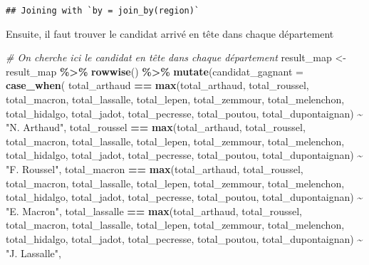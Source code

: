 \documentclass[
]{article}
\newenvironment{Shaded}{\begin{snugshade}}{\end{snugshade}}
\newcommand{\AttributeTok}[1]{\textcolor[rgb]{0.13,0.29,0.53}{#1}}
\newcommand{\CommentTok}[1]{\textcolor[rgb]{0.56,0.35,0.01}{\textit{#1}}}
\newcommand{\FunctionTok}[1]{\textcolor[rgb]{0.13,0.29,0.53}{\textbf{#1}}}
\newcommand{\NormalTok}[1]{#1}
\newcommand{\OtherTok}[1]{\textcolor[rgb]{0.56,0.35,0.01}{#1}}
\newcommand{\SpecialCharTok}[1]{\textcolor[rgb]{0.81,0.36,0.00}{\textbf{#1}}}
\newcommand{\StringTok}[1]{\textcolor[rgb]{0.31,0.60,0.02}{#1}}
\begin{document}
\begin{verbatim}
## Joining with `by = join_by(region)`
\end{verbatim}

Ensuite, il faut trouver le candidat arrivé en tête dans chaque
département

\begin{Shaded}
\begin{Highlighting}[]
\CommentTok{\# On cherche ici le candidat en tête dans chaque département}
\NormalTok{result\_map }\OtherTok{\textless{}{-}}\NormalTok{ result\_map }\SpecialCharTok{\%\textgreater{}\%}
  \FunctionTok{rowwise}\NormalTok{() }\SpecialCharTok{\%\textgreater{}\%}
  \FunctionTok{mutate}\NormalTok{(}\AttributeTok{candidat\_gagnant =} \FunctionTok{case\_when}\NormalTok{(}
\NormalTok{    total\_arthaud }\SpecialCharTok{==} \FunctionTok{max}\NormalTok{(total\_arthaud, total\_roussel, total\_macron, }
\NormalTok{                         total\_lassalle, total\_lepen, total\_zemmour, }
\NormalTok{                         total\_melenchon, total\_hidalgo, total\_jadot, }
\NormalTok{                         total\_pecresse, total\_poutou, total\_dupontaignan) }\SpecialCharTok{\textasciitilde{}} \StringTok{"N. Arthaud"}\NormalTok{,}
\NormalTok{    total\_roussel }\SpecialCharTok{==} \FunctionTok{max}\NormalTok{(total\_arthaud, total\_roussel, total\_macron, }
\NormalTok{                         total\_lassalle, total\_lepen, total\_zemmour, }
\NormalTok{                         total\_melenchon, total\_hidalgo, total\_jadot, }
\NormalTok{                         total\_pecresse, total\_poutou, total\_dupontaignan) }\SpecialCharTok{\textasciitilde{}} \StringTok{"F. Roussel"}\NormalTok{,}
\NormalTok{    total\_macron }\SpecialCharTok{==} \FunctionTok{max}\NormalTok{(total\_arthaud, total\_roussel, total\_macron, }
\NormalTok{                        total\_lassalle, total\_lepen, total\_zemmour, }
\NormalTok{                        total\_melenchon, total\_hidalgo, total\_jadot, }
\NormalTok{                        total\_pecresse, total\_poutou, total\_dupontaignan) }\SpecialCharTok{\textasciitilde{}} \StringTok{"E. Macron"}\NormalTok{,}
\NormalTok{    total\_lassalle }\SpecialCharTok{==} \FunctionTok{max}\NormalTok{(total\_arthaud, total\_roussel, total\_macron, }
\NormalTok{                          total\_lassalle, total\_lepen, total\_zemmour, }
\NormalTok{                          total\_melenchon, total\_hidalgo, total\_jadot, }
\NormalTok{                          total\_pecresse, total\_poutou, total\_dupontaignan) }\SpecialCharTok{\textasciitilde{}} \StringTok{"J. Lassalle"}\NormalTok{,}

\end{Highlighting}
\end{Shaded}
\end{document}
